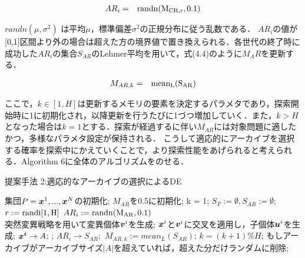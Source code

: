 \documentclass[a4paper,11pt,oneside,openany]{jsbook}
\def\vector#1{\mbox{\boldmath $#1$}}
\begin{document}
\begin{eqnarray}
  AR_i & = & \rm{randn}(M_{CR,r}, 0.1)
\end{eqnarray}

$randn(\mu,\sigma^2)$ は平均$\mu$，標準偏差$\sigma^2$の正規分布に従う乱数である．
$AR_i$の値が[0,1]区間より外の場合は超えた方の境界値で置き換えられる．各世代の終了時に成功した$AR_i$の集合$S_{AR}$のLehmer平均を用いて，式(4.4)のように$M_AR$を更新する．

\begin{eqnarray}
  M_{AR,k} & = & \rm{mean_L}(S_{AR})
\end{eqnarray}

ここで，$k \in [1,H]$は更新するメモリの要素を決定するパラメタであり，探索開始時に1に初期化され，以降更新を行うたびに1づつ増加していく．また，$k > H$となった場合は$k = 1$とする．探索が経過するに伴い$M_{AR}$には対象問題に適したかつ，多様なパラメタ設定が保持される．
こうして適応的にアーカイブを選択する確率を探索中にかえていくことで，より探索性能をあげられると考えられる．Algorithm 6に全体のアルゴリズムをのせる．

\newpage
\begin{algorithm}
\caption{提案手法 2:適応的なアーカイブの選択によるDE}
\label{alg:pbnf}
\begin{algorithmic}
\STATE 集団$P={\vector{x}^1,...,\vector{x}^N}$の初期化;
\STATE $M _{AR}$を0.5に初期化;
\STATE k = 1;
    \STATE $S_F := \emptyset, S_{AR} := \emptyset$;
        \STATE $r := \rm{randi}[1,H]$
        \STATE $AR_i := \rm{randn}(M_{AR}, 0.1)$ \\
        \STATE 突然変異戦略を用いて変異個体{$\vector{v}^i$}を生成;
        \STATE $\vector{x}^i$と$\vector{v}^i$に交叉を適用し，子個体$\vector{u}^i$を生成;
     \ENDFOR
        \IF {$f(\vector{u}^i) \leqq f(\vector{x}^i)$}
            \STATE $\vector{x^i} \rightarrow {A}$;
            \STATE {$\vector{x}^i=\vector{u}^i$};
            \STATE $AR_i \rightarrow S_{AR};$
        \ENDIF
    \ENDFOR
        \STATE $M_{AR,k}  :=  mean_L(S_{AR})$;
        \STATE $k = (k+1) \% H$;
    \ENDIF
    \STATE もしアーカイブがアーカイブサイズ$|A|$を超えていれば，超えた分だけランダムに削除;
\ENDWHILE
\end{algorithmic}
\end{algorithm}
\newpage
\end{document}
